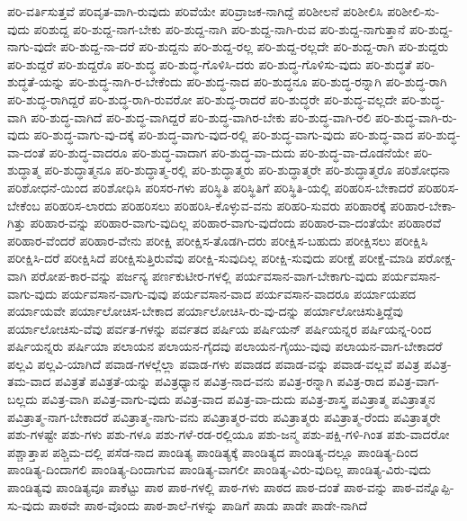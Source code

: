 {ಪರಿ-ವರ್ತಿಸುತ್ತವೆ
ಪರಿವೃತ-ವಾಗಿ-ರುವುದು
ಪರಿವೆಯೇ
ಪರಿವ್ರಾಜಕ-ನಾಗಿದ್ದೆ
ಪರಿಶೀಲನೆ
ಪರಿಶೀಲಿಸಿ
ಪರಿಶೀಲಿ-ಸು-ವುದು
ಪರಿಶುದ್ದ
ಪರಿ-ಶುದ್ದ-ನಾಗ-ಬೇಕು
ಪರಿ-ಶುದ್ದ-ನಾಗಿ
ಪರಿ-ಶುದ್ದ-ನಾಗಿ-ರುವ
ಪರಿ-ಶುದ್ದ-ನಾಗುತ್ತಾನೆ
ಪರಿ-ಶುದ್ದ-ನಾಗು-ವುದೇ
ಪರಿ-ಶುದ್ದ-ನಾ-ದರೆ
ಪರಿ-ಶುದ್ದನು
ಪರಿ-ಶುದ್ದ-ರಲ್ಲ
ಪರಿ-ಶುದ್ದ-ರಲ್ಲದೇ
ಪರಿ-ಶುದ್ದ-ರಾಗಿ
ಪರಿ-ಶುದ್ದರು
ಪರಿ-ಶುದ್ದರೆ
ಪರಿ-ಶುದ್ದರೊ
ಪರಿ-ಶುದ್ಧ
ಪರಿ-ಶುದ್ಧ-ಗೊಳಿಸಿ-ದರು
ಪರಿ-ಶುದ್ಧ-ಗೊಳಿಸು-ವುದು
ಪರಿ-ಶುದ್ಧತೆ
ಪರಿ-ಶುದ್ಧತೆ-ಯನ್ನು
ಪರಿ-ಶುದ್ಧ-ನಾಗಿ-ರ-ಬೇಕೆಂದು
ಪರಿ-ಶುದ್ಧ-ನಾದ
ಪರಿ-ಶುದ್ಧನೂ
ಪರಿ-ಶುದ್ಧ-ರನ್ನಾಗಿ
ಪರಿ-ಶುದ್ಧ-ರಾಗಿ
ಪರಿ-ಶುದ್ಧ-ರಾಗಿದ್ದರೆ
ಪರಿ-ಶುದ್ಧ-ರಾಗಿ-ರುವರೋ
ಪರಿ-ಶುದ್ಧ-ರಾದರೆ
ಪರಿ-ಶುದ್ಧರೇ
ಪರಿ-ಶುದ್ಧ-ವಲ್ಲದೇ
ಪರಿ-ಶುದ್ಧ-ವಾಗಿ
ಪರಿ-ಶುದ್ಧ-ವಾಗಿದೆ
ಪರಿ-ಶುದ್ಧ-ವಾಗಿದ್ದರೆ
ಪರಿ-ಶುದ್ಧ-ವಾಗಿರ-ಬೇಕು
ಪರಿ-ಶುದ್ಧ-ವಾಗಿ-ರಲಿ
ಪರಿ-ಶುದ್ಧ-ವಾಗಿ-ರು-ವುದು
ಪರಿ-ಶುದ್ಧ-ವಾಗು-ವು-ದಕ್ಕೆ
ಪರಿ-ಶುದ್ಧ-ವಾಗು-ವುದ-ರಲ್ಲಿ
ಪರಿ-ಶುದ್ಧ-ವಾಗು-ವುದು
ಪರಿ-ಶುದ್ಧ-ವಾದ
ಪರಿ-ಶುದ್ಧ-ವಾ-ದಂತೆ
ಪರಿ-ಶುದ್ಧ-ವಾದರೂ
ಪರಿ-ಶುದ್ಧ-ವಾದಾಗ
ಪರಿ-ಶುದ್ಧ-ವಾ-ದುದು
ಪರಿ-ಶುದ್ಧ-ವಾ-ದೊಡನೆಯೇ
ಪರಿ-ಶುದ್ಧಾತ್ಮ
ಪರಿ-ಶುದ್ಧಾತ್ಮನೂ
ಪರಿ-ಶುದ್ಧಾತ್ಮ-ರಲ್ಲಿ
ಪರಿ-ಶುದ್ಧಾತ್ಮರು
ಪರಿ-ಶುದ್ಧಾತ್ಮರೇ
ಪರಿ-ಶುದ್ಧಾತ್ಮರೊ
ಪರಿಶೋಧನಾ
ಪರಿಶೋಧನೆ-ಯಿಂದ
ಪರಿಶೋಧಿಸಿ
ಪರಿಸರ-ಗಳು
ಪರಿಸ್ಥಿತಿ
ಪರಿಸ್ಥಿತಿಗೆ
ಪರಿಸ್ಥಿತಿ-ಯಲ್ಲಿ
ಪರಿಹರಿಸ-ಬೇಕಾದರೆ
ಪರಿಹರಿಸ-ಬೇಕೆಂಬ
ಪರಿಹರಿಸ-ಲಾರದು
ಪರಿಹರಿಸಲು
ಪರಿಹರಿಸಿ-ಕೊಳ್ಳುವ-ವನು
ಪರಿಹರಿ-ಸುವರು
ಪರಿಹಾರಕ್ಕೆ
ಪರಿಹಾರ-ಬೇಕಾ-ಗಿತ್ತು
ಪರಿಹಾರ-ವನ್ನು
ಪರಿಹಾರ-ವಾಗು-ವುದಿಲ್ಲ
ಪರಿಹಾರ-ವಾಗು-ವುದೆಂದು
ಪರಿಹಾರ-ವಾ-ದಂತೆಯೇ
ಪರಿಹಾರವೆ
ಪರಿಹಾರ-ವೆಂದರೆ
ಪರಿಹಾರ-ವೇನು
ಪರೀಕ್ಷಿ
ಪರೀಕ್ಷಿಸ-ತೊಡಗಿ-ದರು
ಪರೀಕ್ಷಿಸ-ಬಹುದು
ಪರೀಕ್ಷಿಸಲು
ಪರೀಕ್ಷಿಸಿ
ಪರೀಕ್ಷಿಸಿ-ದರೆ
ಪರೀಕ್ಷಿಸಿದೆ
ಪರೀಕ್ಷಿಸುತ್ತಿರುವೆವು
ಪರೀಕ್ಷಿ-ಸುವುದಿಲ್ಲ
ಪರೀಕ್ಷಿ-ಸುವುದು
ಪರೀಕ್ಷೆ
ಪರೀಕ್ಷೆ-ಮಾಡಿ
ಪರೋಕ್ಷ-ವಾಗಿ
ಪರೋಪ-ಕಾರ-ವನ್ನು
ಪರ್ಜನ್ಯ
ಪರ್ಣಕುಟೀರ-ಗಳಲ್ಲಿ
ಪರ್ಯವಸಾನ-ವಾಗ-ಬೇಕಾಗು-ವುದು
ಪರ್ಯವಸಾನ-ವಾಗು-ವುದು
ಪರ್ಯವಸಾನ-ವಾಗು-ವುವು
ಪರ್ಯವಸಾನ-ವಾದ
ಪರ್ಯವಸಾನ-ವಾದರೂ
ಪರ್ಯಾಯಪದ
ಪರ್ಯಾಯವೇ
ಪರ್ಯಾಲೋಚಿಸ-ಬೇಕಾದ
ಪರ್ಯಾಲೋಚಿಸಿ-ರು-ವು-ದನ್ನು
ಪರ್ಯಾಲೋಚಿಸುತ್ತಿದ್ದೆವು
ಪರ್ಯಾಲೋಚಿಸು-ವೆವು
ಪರ್ವತ-ಗಳನ್ನು
ಪರ್ವತದ
ಪರ್ಷಿಯ
ಪರ್ಷಿಯನ್
ಪರ್ಷಿಯನ್ನರ
ಪರ್ಷಿಯನ್ನ-ರಿಂದ
ಪರ್ಷಿಯನ್ನರು
ಪರ್ಷಿಯಾ
ಪಲಾಯನ
ಪಲಾಯನ-ಗೈದವು
ಪಲಾಯನ-ಗೈಯು-ವುವು
ಪಲಾಯನ-ವಾಗ-ಬೇಕಾದರೆ
ಪಲ್ಲವಿ
ಪಲ್ಲವಿ-ಯಾಗಿದೆ
ಪವಾಡ-ಗಳಲ್ಲೆಲ್ಲಾ
ಪವಾಡ-ಗಳು
ಪವಾಡದ
ಪವಾಡ-ವನ್ನು
ಪವಾಡ-ವಲ್ಲವೆ
ಪವಿತ್ರ
ಪವಿತ್ರ-ತಮ-ವಾದ
ಪವಿತ್ರತೆ
ಪವಿತ್ರತೆ-ಯನ್ನು
ಪವಿತ್ರಧ್ಯಾನ
ಪವಿತ್ರ-ನಾದ-ವನು
ಪವಿತ್ರ-ರನ್ನಾಗಿ
ಪವಿತ್ರ-ರಾದ
ಪವಿತ್ರ-ವಾಗ-ಬಲ್ಲದು
ಪವಿತ್ರ-ವಾಗಿ
ಪವಿತ್ರ-ವಾಗು-ವುದು
ಪವಿತ್ರ-ವಾದ
ಪವಿತ್ರ-ವಾ-ದುದು
ಪವಿತ್ರ-ಶಾಸ್ತ್ರ
ಪವಿತ್ರಾತ್ಮ
ಪವಿತ್ರಾತ್ಮನ
ಪವಿತ್ರಾತ್ಮ-ನಾಗ-ಬೇಕಾದರೆ
ಪವಿತ್ರಾತ್ಮ-ನಾಗು-ವನು
ಪವಿತ್ರಾತ್ಮರ-ವರು
ಪವಿತ್ರಾತ್ಮರು
ಪವಿತ್ರಾತ್ಮ-ರೆಂದು
ಪವಿತ್ರಾತ್ಮರೇ
ಪಶು-ಗಳಷ್ಟೇ
ಪಶು-ಗಳು
ಪಶು-ಗಳೂ
ಪಶು-ಗಳೆ-ರಡ-ರಲ್ಲಿಯೂ
ಪಶು-ಜನ್ಮ
ಪಶು-ಪಕ್ಷಿ-ಗಳಿ-ಗಿಂತ
ಪಶು-ವಾದರೋ
ಪಶ್ಚಾತ್ತಾಪ
ಪಶ್ಚಿಮ-ದಲ್ಲಿ
ಪಸೆಡ-ನಾದ
ಪಾಂಡಿತ್ಯ
ಪಾಂಡಿತ್ಯಕ್ಕೆ
ಪಾಂಡಿತ್ಯದ
ಪಾಂಡಿತ್ಯ-ದಲ್ಲೂ
ಪಾಂಡಿತ್ಯ-ದಿಂದ
ಪಾಂಡಿತ್ಯ-ದಿಂದಾಗಲಿ
ಪಾಂಡಿತ್ಯ-ದಿಂದಾಗುವ
ಪಾಂಡಿತ್ಯ-ವಾಗಲೀ
ಪಾಂಡಿತ್ಯ-ವಿರು-ವುದಿಲ್ಲ
ಪಾಂಡಿತ್ಯ-ವಿರು-ವುದು
ಪಾಂಡಿತ್ಯವು
ಪಾಂಡಿತ್ಯವೂ
ಪಾಕೆಟ್ಟು
ಪಾಠ
ಪಾಠ-ಗಳಲ್ಲಿ
ಪಾಠ-ಗಳು
ಪಾಠದ
ಪಾಠ-ದಂತೆ
ಪಾಠ-ವನ್ನು
ಪಾಠ-ವನ್ನೊಪ್ಪಿ-ಸು-ವುದು
ಪಾಠವೇ
ಪಾಠ-ವೊಂದು
ಪಾಠ-ಶಾಲೆ-ಗಳನ್ನು
ಪಾಡಿಗೆ
ಪಾಡು
ಪಾಡೇ
ಪಾಡೇ-ನಾಗಿದೆ
}
